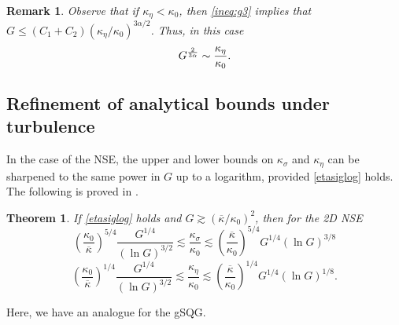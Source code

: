 \documentclass[twoside, reqno]{amsart}
\newtheorem{remark}{Remark}
\numberwithin{lemma}{section}
\newtheorem{theorem}{Theorem}
\numberwithin{theorem}{section}
\numberwithin{proposition}{section}
\numberwithin{equation}{section} %
\newcommand{\ka}{\kappa}
\newcommand{\kbar}{\overline{\ka}}
\newcommand{\al}{\alpha}
\newcommand{\kap}{\kappa}
\begin{document}
{
\begin{remark}
Observe that if $\kap_\eta<\kap_0$, then \eqref{ineq:g3} implies that $G\leq (C_1+C_2)(\kap_\eta/\kap_0)^{3\al/2}$. Thus, in this case
    \begin{align}\notag
        G^{\frac{2}{3\al}}\sim\frac{\kap_\eta}{\kap_0}.
    \end{align}
\end{remark}
}

\subsection{Refinement of analytical bounds under turbulence}
In the case of the NSE, the upper and lower bounds on $\ka_\sigma$ and $\ka_\eta$ can be sharpened to the same power in $G$ up to a logarithm, provided \eqref{etasiglog} holds.  
The following {is}  proved in \cite{Dascaliuc2008}.
\begin{theorem}\label{DFJketaksig}
    If \eqref{etasiglog} holds and $G\gtrsim(\kbar/\ka_0)^2 $, then
for the 2D NSE
\begin{equation}\label{ksigNSE}
    \left(\frac{\ka_0}{\kbar}\right)^{5/4} \frac{G^{1/4}}{(\ln G)^{3/2}}  \lesssim \frac{\ka_\sigma}{\ka_0} \lesssim 
\left(\frac{\kbar}{\ka_0}\right)^{5/4} {G^{1/4}}{(\ln G)^{3/8}}
\end{equation}
\begin{equation}\label{ketaNSE}
\left(\frac{\ka_0}{\kbar}\right)^{1/4} \frac{G^{1/4}}{(\ln G)^{3/2}}  \lesssim \frac{\ka_\eta}{\ka_0} \lesssim 
\left(\frac{\kbar}{\ka_0}\right)^{1/4} {G^{1/4}}{(\ln G)^{1/8}}.
    \end{equation}
\end{theorem}

Here, we have an analogue for the gSQG.
    
\end{document}
